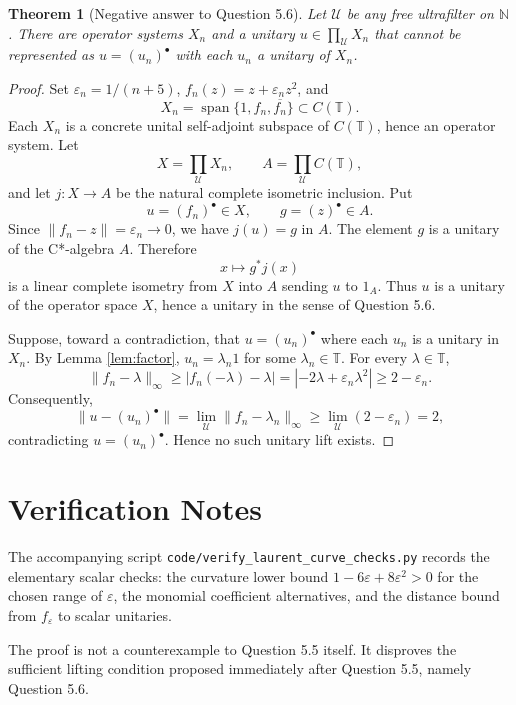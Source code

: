 \documentclass[11pt]{article}
\newtheorem{theorem}{Theorem}
\newcommand{\T}{\mathbb T}
\newcommand{\calU}{\mathcal U}
\begin{document}
\begin{theorem}[Negative answer to Question 5.6]\label{thm:counterexample}
Let \(\calU\) be any free ultrafilter on \(\mathbb N\).  There are operator systems \(X_n\) and a unitary \(u\in\prod_{\calU}X_n\) that cannot be represented as \(u=(u_n)^\bullet\) with each \(u_n\) a unitary of \(X_n\).
\end{theorem}

\begin{proof}
Set \(\varepsilon_n=1/(n+5)\), \(f_n(z)=z+\varepsilon_n z^2\), and
\[
X_n=\operatorname{span}\{1,f_n,\overline{f_n}\}\subset C(\T).
\]
Each \(X_n\) is a concrete unital self-adjoint subspace of \(C(\T)\), hence an operator system.  Let
\[
X=\prod_{\calU}X_n,\qquad A=\prod_{\calU} C(\T),
\]
and let \(j:X\to A\) be the natural complete isometric inclusion.  Put
\[
u=(f_n)^\bullet\in X,\qquad g=(z)^\bullet\in A.
\]
Since \(\|f_n-z\|=\varepsilon_n\to0\), we have \(j(u)=g\) in \(A\).  The element \(g\) is a unitary of the C*-algebra \(A\).  Therefore
\[
x\mapsto g^*j(x)
\]
is a linear complete isometry from \(X\) into \(A\) sending \(u\) to \(1_A\).  Thus \(u\) is a unitary of the operator space \(X\), hence a unitary in the sense of Question 5.6.

Suppose, toward a contradiction, that \(u=(u_n)^\bullet\) where each \(u_n\) is a unitary in \(X_n\).  By Lemma \ref{lem:factor}, \(u_n=\lambda_n1\) for some \(\lambda_n\in\T\).  For every \(\lambda\in\T\),
\[
\|f_n-\lambda\|_\infty
\ge |f_n(-\lambda)-\lambda|
=|-2\lambda+\varepsilon_n\lambda^2|
\ge 2-\varepsilon_n.
\]
Consequently,
\[
\|u-(u_n)^\bullet\|
=\lim_{\calU}\|f_n-\lambda_n\|_\infty
\ge \lim_{\calU}(2-\varepsilon_n)=2,
\]
contradicting \(u=(u_n)^\bullet\).  Hence no such unitary lift exists.
\end{proof}

\section*{Verification Notes}

The accompanying script \texttt{code/verify\_laurent\_curve\_checks.py} records the elementary scalar checks: the curvature lower bound \(1-6\varepsilon+8\varepsilon^2>0\) for the chosen range of \(\varepsilon\), the monomial coefficient alternatives, and the distance bound from \(f_\varepsilon\) to scalar unitaries.

The proof is not a counterexample to Question 5.5 itself.  It disproves the sufficient lifting condition proposed immediately after Question 5.5, namely Question 5.6.
\end{document}
